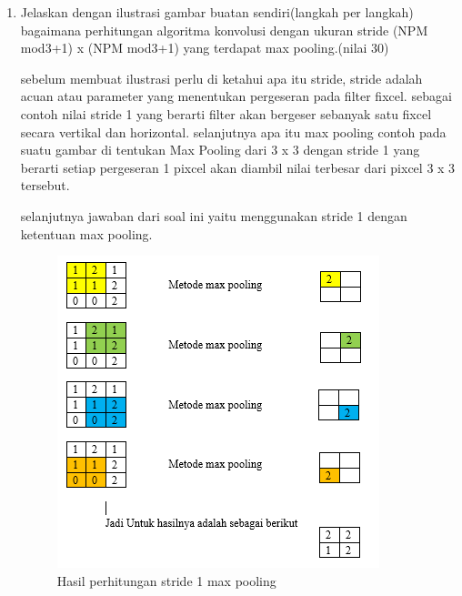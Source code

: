 \begin{enumerate}
\item Jelaskan dengan ilustrasi gambar buatan sendiri(langkah per langkah) bagaimana perhitungan algoritma konvolusi dengan ukuran stride (NPM mod3+1) x (NPM mod3+1) yang terdapat max pooling.(nilai 30)\par
 sebelum membuat ilustrasi perlu di ketahui apa itu stride, stride adalah acuan atau parameter yang menentukan pergeseran pada filter fixcel. sebagai contoh nilai stride 1 yang berarti filter akan bergeser sebanyak satu fixcel secara vertikal dan horizontal. selanjutnya apa itu max pooling contoh pada suatu gambar di tentukan Max Pooling dari 3 x 3 dengan stride 1 yang berarti setiap pergeseran 1 pixcel akan diambil nilai terbesar dari pixcel 3 x 3 tersebut.\par

selanjutnya jawaban dari soal ini yaitu menggunakan stride 1 dengan ketentuan max pooling. 
\begin{figure}[ht]
\centering
\includegraphics[scale=0.4]{figures/1174012/chapter7/1,10.PNG}
\caption{Hasil perhitungan stride 1 max pooling}
\label{Contoh}
\end{figure}

\end{enumerate}

